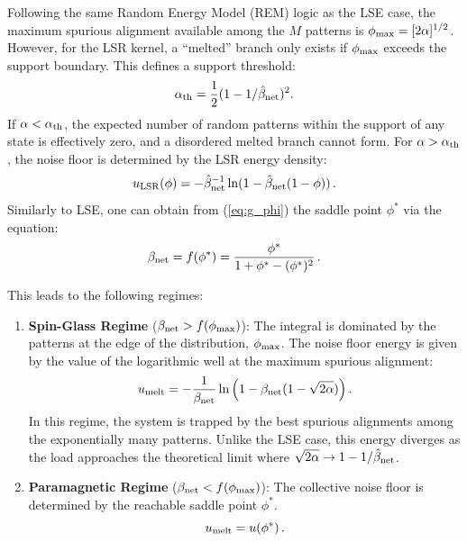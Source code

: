 \documentclass{article}
\theoremstyle{plain}
\theoremstyle{definition}
\theoremstyle{remark}
\begin{document}
Following the same Random Energy Model (REM) logic as the LSE case, the maximum spurious alignment available among the $M$ patterns is $\phi_{\rm max} = [2\alpha]^{1/2}$. However, for the LSR kernel, a ``melted'' branch only exists if $\phi_{\rm max}$ exceeds the support boundary. This defines a support threshold:
\begin{equation}
    \alpha_{\rm th} = \frac{1}{2} (1 - 1/\hat\beta_{\rm net})^2 .
    \label{eq:alpha_th}
\end{equation}
If $\alpha < \alpha_{\rm th}$, the expected number of random patterns within the support of any state is effectively zero, and a disordered melted branch cannot form. For $\alpha > \alpha_{\rm th}$, the noise floor is determined by the LSR energy density:
\begin{equation}
    u_{\rm LSR}(\phi) = -\hat\beta_{\rm net}^{-1} \ln ( 1 - \hat\beta_{\rm net}(1 - \phi) )\,.
\end{equation}
Similarly to LSE, one can obtain from (\ref{eq:g_phi}) the saddle point $\phi^*$ via the equation:
\begin{equation}
    \beta_{\rm net} = f(\phi^*) = \frac{\phi^*}{1 + \phi^* - (\phi^*)^2}\,.
\end{equation}

This leads to the following regimes:
\begin{enumerate}
    \item \textbf{Spin-Glass Regime} ($\beta_{\rm net} > f(\phi_{\rm max})$): 
    The integral is dominated by the patterns at the edge of the distribution, $\phi_{\rm max}$. The noise floor energy is given by the value of the logarithmic well at the maximum spurious alignment:
    \begin{equation}
        u_{\rm melt} = -\frac{1}{\beta_{\rm net}} \ln \left( 1 - \beta_{\rm net} (1 - \sqrt{2\alpha}) \right).
    \end{equation}
    In this regime, the system is trapped by the best spurious alignments among the exponentially many patterns. Unlike the LSE case, this energy diverges as the load approaches the theoretical limit where $\sqrt{2\alpha} \to 1 - 1/\hat\beta_{\rm net}$.
    
    \item \textbf{Paramagnetic Regime} ($\beta_{\rm net} < f(\phi_{\rm max})$): 
    The collective noise floor is determined by the reachable saddle point $\phi^*$. 
    \begin{equation}
        u_{\rm melt} = u(\phi^*)\,.
    \end{equation}
    
\end{enumerate}
\end{document}
